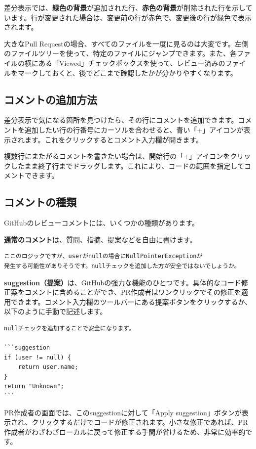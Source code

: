 差分表示では、\textbf{緑色の背景}が追加された行、\textbf{赤色の背景}が削除された行を示しています。行が変更された場合は、変更前の行が赤色で、変更後の行が緑色で表示されます。

大きなPull Requestの場合、すべてのファイルを一度に見るのは大変です。左側のファイルツリーを使って、特定のファイルにジャンプできます。また、各ファイルの横にある「Viewed」チェックボックスを使って、レビュー済みのファイルをマークしておくと、後でどこまで確認したかが分かりやすくなります。

\subsection{コメントの追加方法}

差分表示で気になる箇所を見つけたら、その行にコメントを追加できます。コメントを追加したい行の行番号にカーソルを合わせると、青い「+」アイコンが表示されます。これをクリックするとコメント入力欄が開きます。

複数行にまたがるコメントを書きたい場合は、開始行の「+」アイコンをクリックしたまま終了行までドラッグします。これにより、コードの範囲を指定してコメントできます。

\subsection{コメントの種類}

GitHubのレビューコメントには、いくつかの種類があります。

\textbf{通常のコメント}は、質問、指摘、提案などを自由に書けます。

\begin{lstlisting}[language={}]
ここのロジックですが、userがnullの場合にNullPointerExceptionが
発生する可能性がありそうです。nullチェックを追加した方が安全ではないでしょうか。
\end{lstlisting}

\textbf{suggestion（提案）}は、GitHubの強力な機能のひとつです。具体的なコード修正案をコメントに含めることができ、PR作成者はワンクリックでその修正を適用できます。コメント入力欄のツールバーにある提案ボタンをクリックするか、以下のように手動で記述します。

\begin{lstlisting}[language={}]
nullチェックを追加することで安全になります。

```suggestion
if (user != null) {
    return user.name;
}
return "Unknown";
```
\end{lstlisting}

PR作成者の画面では、このsuggestionに対して「Apply suggestion」ボタンが表示され、クリックするだけでコードが修正されます。小さな修正であれば、PR作成者がわざわざローカルに戻って修正する手間が省けるため、非常に効率的です。


